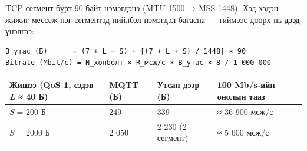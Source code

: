 TCP сегмент бүрт 90 байт нэмэгдэнэ (MTU 1500 → MSS 1448). Хэд хэдэн жижиг мессеж нэг сегментэд нийлбэл нэмэгдэл багасна --- тиймээс доорх нь \textbf{дээд} үнэлгээ:

\begin{verbatim}
B_утас (Б)      = (7 + L + S) + ⌈(7 + L + S) / 1448⌉ × 90
Bitrate (Mbit/с) = N_холболт × R_мсж/с × B_утас × 8 / 1 000 000
\end{verbatim}

\begingroup\scriptsize\begin{longtable}[]{@{}llll@{}}
\toprule
\begin{minipage}[b]{0.22\columnwidth}\raggedright
Жишээ (QoS 1, сэдэв \emph{L} ≈ 40 Б)\strut
\end{minipage} & \begin{minipage}[b]{0.22\columnwidth}\raggedright
MQTT (Б)\strut
\end{minipage} & \begin{minipage}[b]{0.22\columnwidth}\raggedright
Утсан дээр (Б)\strut
\end{minipage} & \begin{minipage}[b]{0.22\columnwidth}\raggedright
100 Mb/s-ийн онолын тааз\strut
\end{minipage}\tabularnewline
\midrule
\endhead
\begin{minipage}[t]{0.22\columnwidth}\raggedright
\emph{S} = 200 Б\strut
\end{minipage} & \begin{minipage}[t]{0.22\columnwidth}\raggedright
249\strut
\end{minipage} & \begin{minipage}[t]{0.22\columnwidth}\raggedright
339\strut
\end{minipage} & \begin{minipage}[t]{0.22\columnwidth}\raggedright
≈ 36 900 мсж/с\strut
\end{minipage}\tabularnewline
\begin{minipage}[t]{0.22\columnwidth}\raggedright
\emph{S} = 2000 Б\strut
\end{minipage} & \begin{minipage}[t]{0.22\columnwidth}\raggedright
2 050\strut
\end{minipage} & \begin{minipage}[t]{0.22\columnwidth}\raggedright
2 230 (2 сегмент)\strut
\end{minipage} & \begin{minipage}[t]{0.22\columnwidth}\raggedright
≈ 5 600 мсж/с\strut
\end{minipage}\tabularnewline
\bottomrule
\end{longtable}\endgroup

